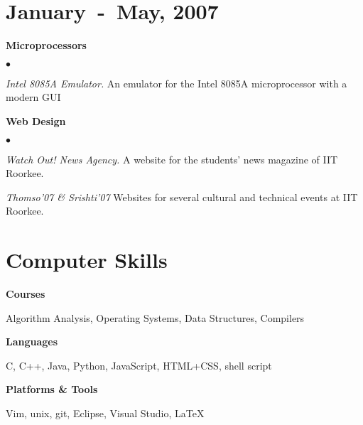 \documentclass[margin,line]{res}
\newcommand{\datesection}[1]{\section{\textnormal{\scriptsize \textcolor{subtle}{#1}}}}
\newenvironment{list1}{
  \begin{list}{\ding{113}}{%
      \setlength{\itemsep}{0in}
      \setlength{\parsep}{0in} \setlength{\parskip}{0in}
      \setlength{\topsep}{0in} \setlength{\partopsep}{0in} 
      \setlength{\leftmargin}{0.17in}}}{\end{list}}
\newenvironment{list2}{
  \begin{list}{$\bullet$}{%
      \setlength{\itemsep}{0in}
      \setlength{\parsep}{0in} \setlength{\parskip}{0in}
      \setlength{\topsep}{0in} \setlength{\partopsep}{0in} 
      \setlength{\leftmargin}{0.2in}}}{\end{list}}
\begin{document}
\begin{resume}
\datesection{January~-~May, 2007}
{\bf Microprocessors}
\begin{list2}
\item {\em Intel 8085A Emulator.} An emulator for the Intel 8085A microprocessor with a modern GUI
\end{list2}

{\bf Web Design}
\begin{list2}
\item {\em Watch Out! News Agency.} A website for the students' news magazine of IIT Roorkee.
\item {\em Thomso'07 \& Srishti'07} Websites for several cultural and technical events at IIT Roorkee.
\end{list2}

\section{\sc Computer Skills} 
\textbf{Courses}
	\begin{list1}
		\item[]  Algorithm Analysis, Operating Systems, Data Structures, Compilers
	\end{list1}

\textbf{Languages}
	\begin{list1}
		\item[]  C, C++, Java, Python, JavaScript, HTML+CSS, shell script
	\end{list1}

\textbf{Platforms \& Tools}
	\begin{list1}
		\item[] Vim, unix, git, Eclipse, Visual Studio, \LaTeX{}
	\end{list1}

\end{resume}
\end{document}
